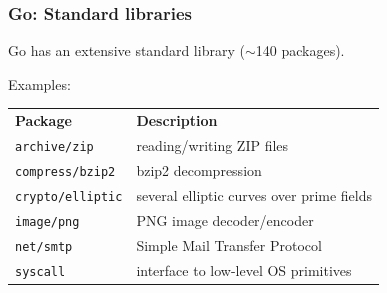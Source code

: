 \begin{frame}[t]
  \frametitle{Go: Standard libraries}

  Go has an extensive standard library ($\sim$140 packages).

  \vspace{\baselineskip}
  Examples:

  \vspace{\baselineskip}
  \begin{tabular}{ll}
    \bfseries{}Package  & \bfseries{}Description \\
    \texttt{archive/zip} & reading/writing ZIP files \\
    \texttt{compress/bzip2} & bzip2 decompression \\
    \texttt{crypto/elliptic} & several elliptic curves over prime fields \\
    \texttt{image/png} & PNG image decoder/encoder \\
    \texttt{net/smtp} & Simple Mail Transfer Protocol \\
    \texttt{syscall} & interface to low-level OS primitives \\
  \end{tabular}

\end{frame}

